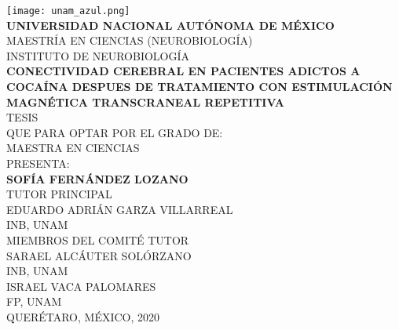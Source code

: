 \begin{titlepage}
    \begin{center}
        \texttt{[image: unam\_azul.png]}\\
        \textbf{UNIVERSIDAD NACIONAL AUTÓNOMA DE MÉXICO}\\
        MAESTRÍA EN CIENCIAS (NEUROBIOLOGÍA)\\
        INSTITUTO DE NEUROBIOLOGÍA\\
        \vspace{10mm}
        \large
        \textbf{CONECTIVIDAD CEREBRAL EN PACIENTES ADICTOS A COCAÍNA DESPUES DE TRATAMIENTO CON ESTIMULACIÓN MAGNÉTICA TRANSCRANEAL REPETITIVA}\\
        \vspace{10mm}
        \large
        TESIS\\
        \normalsize
        QUE PARA OPTAR POR EL GRADO DE:\\
        MAESTRA EN CIENCIAS\\
        \vspace{10mm}
        PRESENTA:\\
        \large
        \textbf{SOFÍA FERNÁNDEZ LOZANO}\\
        \vfill
        \normalsize
        TUTOR PRINCIPAL\\
        EDUARDO ADRIÁN GARZA VILLARREAL\\
        INB, UNAM\\
        \vspace{3mm}
        MIEMBROS DEL COMITÉ TUTOR\\
        SARAEL ALCÁUTER SOLÓRZANO\\
        INB, UNAM\\
        \vspace{1mm}
        ISRAEL VACA PALOMARES\\
        FP, UNAM\\
        \vspace{5mm}
        QUERÉTARO, MÉXICO, 2020
    \end{center}
\end{titlepage}
